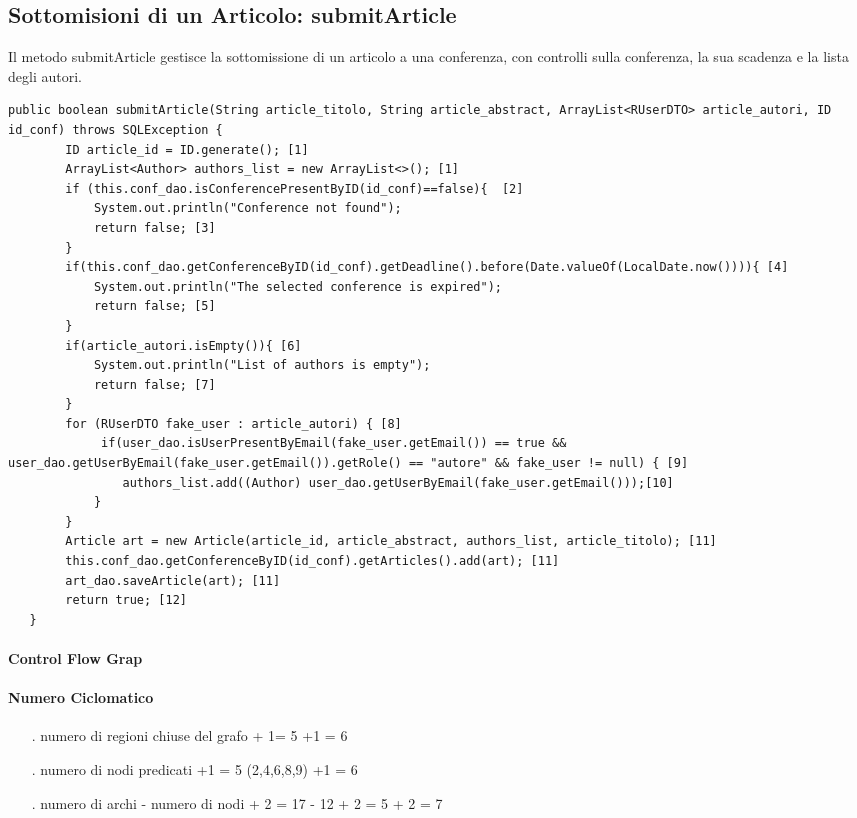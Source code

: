 \subsection{Sottomisioni di un Articolo: submitArticle}
Il metodo submitArticle gestisce la sottomissione di un articolo a una conferenza, con controlli sulla conferenza, la sua scadenza e la lista degli autori.
\begin{lstlisting}
public boolean submitArticle(String article_titolo, String article_abstract, ArrayList<RUserDTO> article_autori, ID id_conf) throws SQLException { 
        ID article_id = ID.generate(); [1]
        ArrayList<Author> authors_list = new ArrayList<>(); [1]
        if (this.conf_dao.isConferencePresentByID(id_conf)==false){  [2]
            System.out.println("Conference not found");
            return false; [3]
        }
        if(this.conf_dao.getConferenceByID(id_conf).getDeadline().before(Date.valueOf(LocalDate.now()))){ [4]
            System.out.println("The selected conference is expired");
            return false; [5]
        }
        if(article_autori.isEmpty()){ [6]
            System.out.println("List of authors is empty");
            return false; [7]
        }
        for (RUserDTO fake_user : article_autori) { [8]
             if(user_dao.isUserPresentByEmail(fake_user.getEmail()) == true && user_dao.getUserByEmail(fake_user.getEmail()).getRole() == "autore" && fake_user != null) { [9]
                authors_list.add((Author) user_dao.getUserByEmail(fake_user.getEmail()));[10]
            }
        }
        Article art = new Article(article_id, article_abstract, authors_list, article_titolo); [11]
        this.conf_dao.getConferenceByID(id_conf).getArticles().add(art); [11]
        art_dao.saveArticle(art); [11]
        return true; [12]
   } 
\end{lstlisting} 
\paragraph{Control Flow Grap}
\paragraph{Numero Ciclomatico}
\begin{itemize}
\item[.] numero di regioni chiuse del grafo + 1= 5 +1 = 6
\item[.] numero di nodi predicati +1 = 5 (2,4,6,8,9) +1 = 6 
\item[.] numero di archi - numero di nodi + 2 = 17 - 12 + 2 = 5 + 2 = 7 
\end{itemize}
